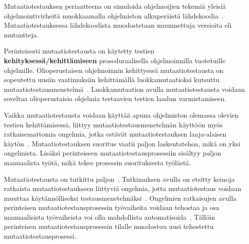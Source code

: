 \documentclass[finnish, grading]{tktltiki2}
\theoremstyle{definition}
\theoremstyle{remark}
\begin{document}
Mutaatiotestauksen periaatteena on simuloida ohjelmoijien tekemiä yleisiä ohjelmointivirheitä muokkaamalla ohjelmiston alkuperäistä lähdekoodia~\cite[s. 649]{Jia:Harman:2011}. Mutaatiotestauksessa lähdekoodista muodostetaan muunnettuja versioita eli mutantteja. 

Perinteisesti mutaatiotestausta on käytetty testien \textbf{kehityksessä/kehittämiseen} proseduraalisella ohjelmoinnilla tuotetuille ohjelmille. Olioperustaisen ohjelmoinnin kehittyessä mutaatiotestausta on sopeutettu uusiin vaatimuksiin kehittämällä luokkamutaatioksi kutsuttu mutaatiotestausmenetelmä~\cite{Kim:Clark:McDermid:2000}. Luokkamutaation avulla mutaatiotestausta voidaan soveltaa olioperustaisia ohjelmia testaavien testien laadun varmistamiseen.

Vaikka mutaatiotestausta voidaan käyttää apuna ohjelmiston olemassa olevien testien kehittämisessä, liittyy mutaatiotestausmenetelmän käyttöön myös ratkaisemattomia ongelmia, jotka estävät mutaatiotestauksen laaja-alaisen käytön~\cite[s. 652]{Jia:Harman:2011}. Mutaatiotestauksen suoritus vaatii paljon laskentatehoa, mikä on yksi ongelmista. Lisäksi perinteiseen mutaatiotestausprosessiin sisältyy paljon manuaalista työtä, mikä tekee prosessin suorituksesta työlästä. 

Mutaatiotestausta on tutkittu paljon~\cite[s. 649]{Jia:Harman:2011}. Tutkimuksen avulla on etsitty keinoja ratkaista mutaatiotestaukseen liittyviä ongelmia, jotta mutaatiotestaus voidaan muuttaa käytännölliseksi testausmenetelmäksi~\cite[s. 649, 652-653]{Jia:Harman:2011}. Ongelmien ratkaisujen avulla perinteisen mutaatiotestausprosessin työvaiheita voidaan tehostaa ja osa manuaalisista työvaiheista voi olla mahdollista automatisoida~\cite[s. 41]{Offutt:Untch:2001}. Tällöin perinteisen mutaatiotestausprosessin tilalle muodostuu uusi tehostettu mutaatiotestausprosessi.

%
%
%
\end{document}
